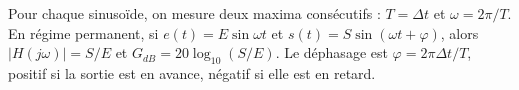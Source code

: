\begin{corrigebox}
Pour chaque sinusoïde, on mesure deux maxima consécutifs :
            $T=\Delta t$ et $\omega=2\pi/T$.
En régime permanent, si $e(t)=E\sin\omega t$ et
            $s(t)=S\sin(\omega t+\varphi)$, alors
            $|H(j\omega)|=S/E$ et $G_{dB}=20\log_{10}(S/E)$.
            Le déphasage est $\varphi=2\pi\Delta t/T$, positif si la sortie est en avance,
            négatif si elle est en retard.
\end{corrigebox}
